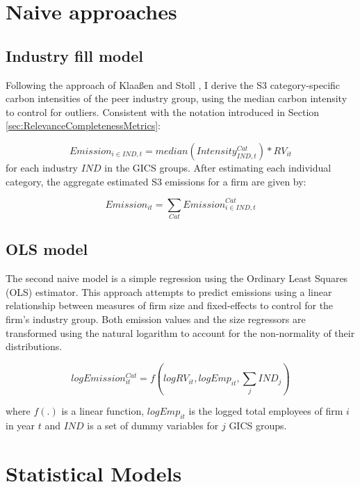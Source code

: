 \documentclass[12pt,twoside]{report}
\begin{document}
\section{Naive approaches}
\subsection{Industry fill model}

Following the approach of Klaaßen and Stoll \cite{klassenstoll2021}, I derive the S3 category-specific carbon intensities of the peer industry group, using the median carbon intensity to control for outliers. Consistent with the notation introduced in Section \ref{sec:RelevanceCompletenessMetrics}:

\begin{equation}
    \mathit{Emission_{i\in{IND},t}}= \mathit{median}(\mathit{Intensity_{IND,t}^{Cat}})*RV_{it}
\end{equation}
for each industry $\mathit{IND}$ in the GICS groups. After estimating each individual category, the aggregate estimated S3 emissions for a firm are given by:

\begin{equation}
    \mathit{Emission}_{it} = \sum_{Cat}\mathit{Emission}_{i \in \mathit{IND, t}}^{Cat}
\end{equation}

\subsection{OLS model}

The second naive model is a simple regression using the Ordinary Least Squares (OLS) estimator. This approach attempts to predict emissions using a linear relationship between measures of firm size and fixed-effects to control for the firm's industry group. Both emission values and the size regressors are transformed using the natural logarithm to account for the non-normality of their distributions.

\begin{equation}
    \mathit{logEmission_{it}^{Cat}}=f(\mathit{logRV_{it}}, \mathit{logEmp_{it}}, \sum_{j}\mathit{IND_{j}})
\end{equation}

where $f(.)$ is a linear function, $\mathit{logEmp_{it}}$ is the logged total employees of firm $i$ in year $t$ and $\mathit{IND}$ is a set of dummy variables for $j$ GICS groups.

\section{Statistical Models}
\end{document}
